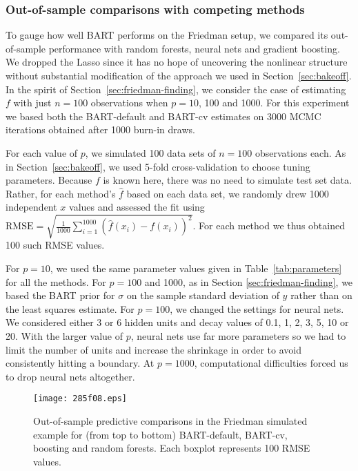 \documentclass[aoas,nameyear,dvips]{arximspdf}
\begin{document}
\subsubsection{Out-of-sample comparisons with competing methods}\label{sec:friedman-train-test}

To gauge how well BART performs on the Friedman setup,
we compared its out-of-sample performance with random forests, neural nets and gradient boosting.
We dropped the Lasso since it has no hope of uncovering the nonlinear structure without
substantial modification of
the approach we used in Section~\ref{sec:bakeoff}.
In the spirit of Section~\ref{sec:friedman-finding}, we consider the case of estimating $f$
with just $n = 100$ observations when $p = 10$, 100 and 1000.
For this experiment we based both the BART-default and BART-cv estimates on 3000 MCMC
iterations obtained after 1000 burn-in draws.

For each value of $p$, we simulated 100 data sets of $n = 100$ observations each.
As in Section~\ref{sec:bakeoff}, we used 5-fold cross-validation to choose tuning parameters.
Because $f$ is known here, there was no need to simulate test set data.
Rather, for each method's $\hat{f}$ based on each data set, we randomly drew 1000 independent $x$ values
and assessed the fit using
$\mathrm{RMSE} = \sqrt{\frac{1}{1000} \sum_{i=1}^{1000} (\hat{f}(x_i) - f(x_i))^2}$.
For each method we thus obtained 100 such RMSE values.

For $p=10$, we used the same parameter values given in
Table~\ref{tab:parameters} for all the methods. For $p = 100$ and
1000, as in Section \ref{sec:friedman-finding}, we based the BART
prior for $\sigma$ on the sample standard deviation of $y$ rather than
on the least squares estimate.  For $p=100$, we changed the settings
for neural nets.  We considered either 3 or 6 hidden units and decay
values of 0.1, 1, 2, 3, 5, 10 or 20.  With the larger value of $p$, neural
nets use far more parameters so we had to limit the number of units and
increase the shrinkage in order to avoid consistently hitting a
boundary. At $p = 1000$, computational difficulties forced us to drop
neural nets altogether.


\begin{figure}

\texttt{[image: 285f08.eps]}

\caption{Out-of-sample predictive comparisons in the Friedman simulated example for
(from top to bottom)  BART-default, BART-cv, boosting and random forests.
Each boxplot represents 100 RMSE values.} \label{fig:friedman-out}
\end{figure}
\end{document}
